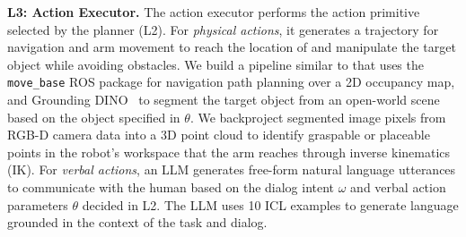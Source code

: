 \textbf{L3: Action Executor.} The action executor performs the action primitive selected by the planner (L2). For \textit{physical actions}, it generates a trajectory for navigation and arm movement to reach the location of and manipulate the target object while avoiding obstacles. We build a pipeline similar to \cite{shah2024bumble} that uses the \texttt{move\_base} ROS package for navigation path planning over a 2D occupancy map, and Grounding DINO~\cite{liu2023grounding} to segment the target object from an open-world scene based on the object specified in $\theta$. We backproject segmented image pixels from RGB-D camera data into a 3D point cloud to identify graspable or placeable points in the robot’s workspace that the arm reaches through inverse kinematics (IK). For \textit{verbal actions}, an LLM generates free-form natural language utterances to communicate with the human based on the dialog intent $\omega$ and verbal action parameters $\theta$ decided in L2. The LLM uses 10 ICL examples to generate language grounded in the context of the task and dialog.






